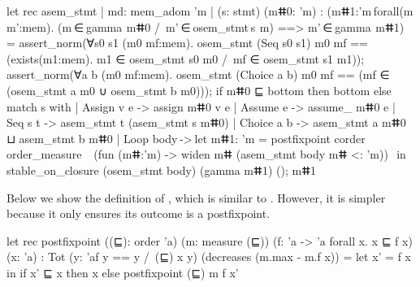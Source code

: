 \documentclass{llncs}
\begin{document}
%
\begin{fstarcode}
let rec asem_stmt {| md: mem_adom 'm |} (s: stmt) (mⵌ0: 'm)
  : (mⵌ1:'m {forall(m m':mem). (m ∈ gamma  mⵌ0 /\ m' ∈ osem_stmt s  m) ==> m' ∈ gamma  mⵌ1})
  = assert_norm(∀s0 s1 (m0 mf:mem). osem_stmt (Seq s0 s1) m0 mf
     == (exists(m1:mem). m1 ∈ osem_stmt s0 m0 /\ mf ∈ osem_stmt s1 m1));
    assert_norm(∀a b (m0 mf:mem). osem_stmt (Choice a b) m0 mf
     == (mf ∈ (osem_stmt a m0 ∪ osem_stmt b m0)));
    if mⵌ0 ⊑ bottom then bottom
    else match s with         | Assign v e -> assign mⵌ0 v e
    | Assume e -> assume_ mⵌ0 e | Seq s t -> asem_stmt t (asem_stmt s mⵌ0)
    | Choice a b -> asem_stmt a mⵌ0 ⊔ asem_stmt b mⵌ0
    | Loop body -> let mⵌ1: 'm = postfixpoint corder order_measure
                   (fun (mⵌ:'m) -> widen mⵌ (asem_stmt body mⵌ <: 'm))
                  in stable_on_closure (osem_stmt body) (gamma mⵌ1) (); mⵌ1
\end{fstarcode}
%
Below we show the definition of , which is
similar to . However, it is simpler because
it only ensures its outcome is a postfixpoint.
%
\begin{fstarcode}
let rec postfixpoint ((⊑): order 'a) (m: measure (⊑))
  (f: 'a -> 'a {forall x. x ⊑ f x}) (x: 'a)
  : Tot (y: 'a{f y == y /\ (⊑) x y}) (decreases (m.max - m.f x))
  = let x' = f x in if x' ⊑ x then x else postfixpoint (⊑) m f x'
\end{fstarcode}
%


%
\newpage
\printglossary[type=\acronymtype]


\end{document}
